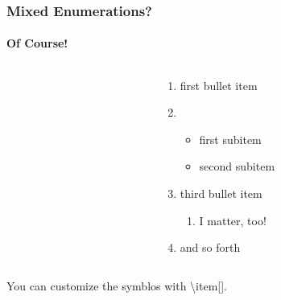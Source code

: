 \begin{frame}
\frametitle{Mixed Enumerations?}
\framesubtitle{Of Course!}

\begin{columns}
\begin{column}{.5\textwidth}
\begin{ttfamily}

\end{ttfamily}
\end{column}
\begin{column}{.5\textwidth}
\begin{enumerate}
\item first bullet item
\item \begin{itemize}
\item first subitem
\item second subitem
\end{itemize}
\item third bullet item
\begin{enumerate}
\item I matter, too!
\end{enumerate}
\item and so forth
\end{enumerate}
\end{column}
\end{columns}
\bigskip
You can customize the symblos with \color{nounibaredI}\textbackslash item\color{nounibagreenI}[]\color{black}. 
\end{frame}